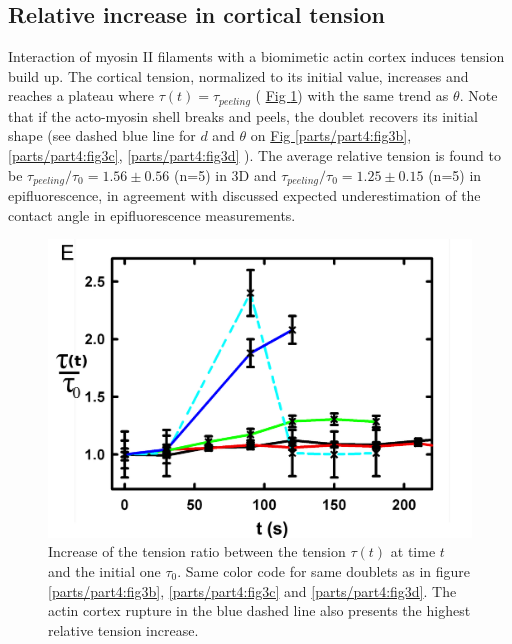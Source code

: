 \documentclass[A4paperpaper,11pt,english]{sphinxmanual}
\begin{document}
\subsection{Relative increase in cortical tension}
\label{parts/part4:relative-increase-in-cortical-tension}
Interaction of myosin II filaments with a biomimetic actin cortex induces
tension build up. The cortical tension, normalized to its initial value,
increases and reaches a plateau where \(\tau(t) = \tau_{peeling}\) (
\hyperref[parts/part4:fig3e]{Fig \ref*{parts/part4:fig3e}}) with the same trend as \(\theta\).  Note that if the acto-myosin shell
breaks and peels, the doublet recovers its initial shape (see dashed blue line
for \(d\) and \(\theta\) on  \hyperref[parts/part4:fig3b]{Fig  \ref*{parts/part4:fig3b}}, \hyperref[parts/part4:fig3c]{ \ref*{parts/part4:fig3c}}, \hyperref[parts/part4:fig3d]{ \ref*{parts/part4:fig3d}} ). The average relative tension is found to
be \(\tau_{peeling}/\tau_0 = 1.56 \pm 0.56\) (n=5) in 3D and
\(\tau_{peeling}/\tau_0  = 1.25 \pm 0.15\) (n=5) in epifluorescence, in
agreement with discussed expected underestimation of the contact angle in epifluorescence measurements.
\begin{figure}[htbp]
\centering
\capstart

\includegraphics[width=0.500\linewidth]{Fig_03-E.png}
\caption{Increase of the tension ratio between the tension \(\tau(t)\) at time
\(t\) and the initial one \(\tau_0\).
Same color code for same doublets as in figure \hyperref[parts/part4:fig3b]{ \ref*{parts/part4:fig3b}}, \hyperref[parts/part4:fig3c]{ \ref*{parts/part4:fig3c}}
and \hyperref[parts/part4:fig3d]{ \ref*{parts/part4:fig3d}}. The actin cortex rupture in the blue dashed line also presents the highest relative tension increase.}\label{parts/part4:fig3e}\end{figure}
\end{document}
